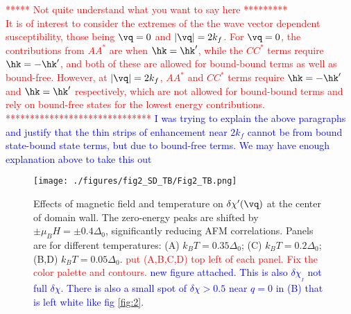 \documentclass[prb,aps,showpacs,amsmath,twocolumn,10pt]{revtex4-1}
\newcommand{\blue}{\textcolor{blue}}
\newcommand{\red}{\textcolor{red}}
\begin{document}
\red{ ***** Not quite understand what you want to say here *********\\
It is of interest to consider the extremes of the the wave vector dependent
susceptibility, those being $\vq = 0$ and $|\vq| = 2k_f$. For $\vq = 0$, the
contributions from $AA^*$ are when $\hk=\hk'$, while the $CC^*$ terms require
$\hk = -\hk'$, and both of these are allowed for bound-bound terms as well as
bound-free. However, at $|\vq| = 2k_f$, $AA^*$ and $CC^*$ terms require
$\hk=-\hk'$ and $\hk = \hk'$ respectively, which are not allowed for
bound-bound terms and rely on bound-free states for the lowest energy
contributions.
}
\red{******************************}
\blue{I was trying to explain the above paragraphs and justify that the thin strips of enhancement near $2k_f$ cannot be from bound state-bound state terms, but due to bound-free terms. We may have enough explanation above to take this out}
\begin{figure}
\texttt{[image: ./figures/fig2\_SD\_TB/Fig2\_TB.png]}
\caption{\label{fig:sus_TB}
Effects of magnetic field and temperature on  $\delta\chi'(\vq)$ at the center of domain wall. 
The zero-energy peaks are shifted by $\pm\mu_BH = \pm0.4\Delta_0$, significantly reducing 
AFM correlations. 
Panels are for different temperatures: 
(A) $k_B T = 0.35\Delta_0$;  
(C) $k_B T = 0.2\Delta_0$; 
(B,D) $k_B T = 0.05\Delta_0$. 
\red{put (A,B,C,D) top left of each panel. Fix the color palette and contours.}
\blue{new figure attached. This is also $\delta\chi_{_I}$ not full $\delta\chi$. There is also a small spot of $\delta\chi>0.5$ near $q=0$ in (B) that is left white like fig \ref{fig:2}.}
} 
\end{figure}
\end{document}
